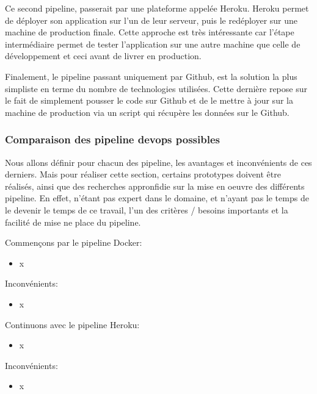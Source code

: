 \documentclass[
    iai, %
    il, %
]{heig-tb}
\begin{document}
Ce second pipeline, passerait par une plateforme appelée Heroku. Heroku permet de déployer son application sur l'un de leur serveur, puis le redéployer sur une machine de production finale.
Cette approche est très intéressante car l'étape intermédiaire permet de tester l'application sur une autre machine que celle de développement et ceci avant de livrer en production.

Finalement, le pipeline passant uniquement par Github, est la solution la plus simpliste en terme du nombre de technologies utilisées. Cette dernière repose sur le fait de simplement pousser le code sur Github et de le mettre à jour sur la machine de production via un script qui récupère les données sur le Github.

\subsubsection{Comparaison des pipeline \Gls{devops} possibles}
Nous allons définir pour chacun des pipeline, les avantages et inconvénients de ces derniers.
Mais pour réaliser cette section, certains prototypes doivent être réalisés, ainsi que des recherches appronfidie sur la mise en oeuvre des différents pipeline.
En effet, n'étant pas expert dans le domaine, et n'ayant pas le temps de le devenir le temps de ce travail, l'un des critères / besoins importants et la facilité de mise ne place du pipeline.

Commençons par le pipeline Docker:
\begin{itemize}
    \item x
\end{itemize}

Inconvénients:
\begin{itemize}
    \item x
\end{itemize}

Continuons avec le pipeline Heroku:
\begin{itemize}
    \item x
\end{itemize}

Inconvénients:
\begin{itemize}
    \item x
\end{itemize}
\end{document}
